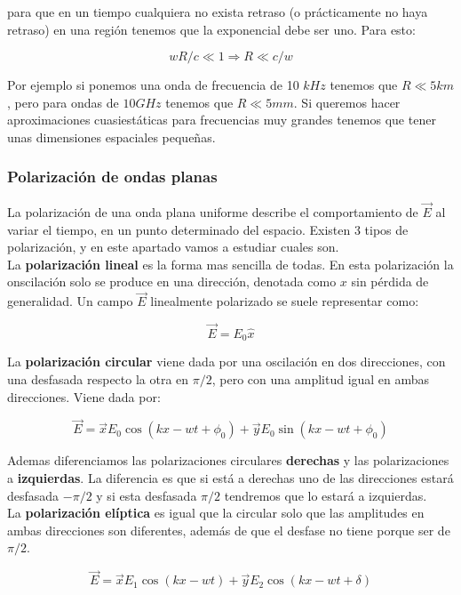 \documentclass[12pt]{article}
\begin{document}
para que en un tiempo cualquiera no exista retraso (o prácticamente no haya retraso) en una región tenemos que la exponencial debe ser uno. Para esto:

$$wR/c \ll 1 \Longrightarrow R \ll c/w $$ 

Por ejemplo si ponemos una onda de frecuencia de 10 $kHz$ tenemos que $R \ll 5 km$, pero para ondas de $10 GHz$ tenemos que $R \ll 5 mm$. Si queremos hacer aproximaciones cuasiestáticas para frecuencias muy grandes tenemos que tener unas dimensiones espaciales pequeñas.

\subsubsection{Polarización de ondas planas}

La polarización de una onda plana uniforme describe el comportamiento de $\vec{E}$ al variar el tiempo, en un punto determinado del espacio. Existen 3 tipos de polarización, y en este apartado vamos a estudiar cuales son. \\

La \textbf{polarización lineal} es la forma mas sencilla de todas. En esta polarización la onscilación solo se produce en una dirección, denotada como $x$ sin pérdida de generalidad. Un campo $\vec{E}$ linealmente polarizado se suele representar como:

$$ \vec{E} = E_0 \widehat{x} $$

La \textbf{polarización circular} viene dada por una oscilación en dos direcciones, con una desfasada respecto la otra en $\pi/2$, pero con una amplitud igual en ambas direcciones. Viene dada por:

$$ \vec{E} = \vec{x} E_0 \cos (kx-wt + \phi_0) + \vec{y} E_0 \sin (kx-wt + \phi_0) $$

Ademas diferenciamos las polarizaciones circulares \textbf{derechas} y las polarizaciones a \textbf{izquierdas}. La diferencia es que si está a derechas uno de las direcciones estará desfasada $-\pi/2$ y si esta desfasada $\pi/2$ tendremos que lo estará a izquierdas.  \\


La \textbf{polarización elíptica} es igual que la circular solo que las amplitudes en ambas direcciones son diferentes, además de que el desfase no tiene porque ser de $\pi/2$. 


$$ \vec{E} = \vec{x} E_1 \cos (kx-wt) + \vec{y} E_2 \cos (kx-wt+\delta) $$
\end{document}
